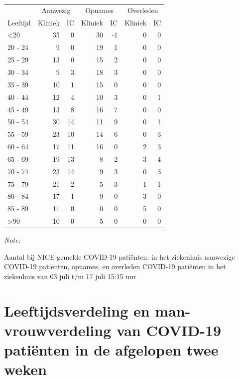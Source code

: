 \documentclass[
  english,
  man,floatsintext]{apa6}
\begin{document}
\begin{table}
\centering\begingroup\fontsize{10}{12}\selectfont

\begin{threeparttable}
\begin{tabular}{lrrrrrr}
\toprule
\multicolumn{1}{c}{ } & \multicolumn{2}{c}{Aanwezig} & \multicolumn{2}{c}{Opnames} & \multicolumn{2}{c}{Overleden} \\
\cmidrule(l{3pt}r{3pt}){2-3} \cmidrule(l{3pt}r{3pt}){4-5} \cmidrule(l{3pt}r{3pt}){6-7}
Leeftijd & Kliniek & IC & Kliniek & IC & Kliniek & IC\\
\midrule
<20 & 35 & 0 & 30 & -1 & 0 & 0\\
20 - 24 & 9 & 0 & 19 & 1 & 0 & 0\\
25 - 29 & 13 & 0 & 15 & 2 & 0 & 0\\
30 - 34 & 9 & 3 & 18 & 3 & 0 & 0\\
35 - 39 & 10 & 1 & 15 & 0 & 0 & 0\\
40 - 44 & 12 & 4 & 10 & 3 & 0 & 1\\
45 - 49 & 13 & 8 & 16 & 7 & 0 & 0\\
50 - 54 & 30 & 14 & 11 & 9 & 0 & 1\\
55 - 59 & 23 & 10 & 14 & 6 & 0 & 3\\
60 - 64 & 17 & 11 & 16 & 0 & 2 & 3\\
65 - 69 & 19 & 13 & 8 & 2 & 3 & 4\\
70 - 74 & 23 & 14 & 9 & 3 & 0 & 3\\
75 - 79 & 21 & 2 & 5 & 3 & 1 & 1\\
80 - 84 & 17 & 1 & 9 & 0 & 3 & 0\\
85 - 89 & 11 & 0 & 0 & 0 & 5 & 0\\
>90 & 10 & 0 & 5 & 0 & 0 & 0\\
\bottomrule
\end{tabular}
\begin{tablenotes}
\item \textit{Note: } 
\item Aantal bij NICE gemelde COVID-19 patiënten: in het ziekenhuis aanwezige COVID-19 patiënten, opnames, en overleden COVID-19 patiënten in het ziekenhuis van 03 juli t/m 17 juli 15:15 uur
\end{tablenotes}
\end{threeparttable}
\endgroup{}
\end{table}

\newpage

\hypertarget{leeftijdsverdeling-en-man-vrouwverdeling-van-covid-19-patiuxebnten-in-de-afgelopen-twee-weken}{%
\section{Leeftijdsverdeling en man-vrouwverdeling van COVID-19 patiënten in de afgelopen twee weken}\label{leeftijdsverdeling-en-man-vrouwverdeling-van-covid-19-patiuxebnten-in-de-afgelopen-twee-weken}}
\end{document}
